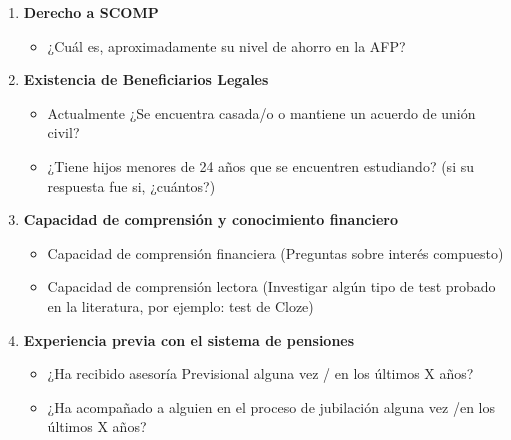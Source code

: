 \begin{enumerate}
    \item \textbf{Derecho a SCOMP}
    \begin{itemize}
        \item ¿Cuál es, aproximadamente su nivel de ahorro en la AFP? 
    \end{itemize}
    \item \textbf{Existencia de Beneficiarios Legales}
    \begin{itemize}
        \item Actualmente ¿Se encuentra casada/o o mantiene un acuerdo de unión civil?
        \item ¿Tiene hijos menores de 24 años que se encuentren estudiando? (si su respuesta fue si, ¿cuántos?) 
    \end{itemize}
    \item \textbf{Capacidad de comprensión y conocimiento financiero}
    \begin{itemize}
        \item Capacidad de comprensión financiera (Preguntas sobre interés compuesto) 
        \item Capacidad de comprensión lectora (Investigar algún tipo de test probado en la literatura, por ejemplo: test de Cloze) 
    \end{itemize}
    \item \textbf{Experiencia previa con el sistema de pensiones}
    \begin{itemize}
        \item ¿Ha recibido asesoría Previsional alguna vez / en los últimos X años? 
        \item ¿Ha acompañado a alguien en el proceso de jubilación alguna vez /en los últimos X años? 
    \end{itemize}
\end{enumerate}
    

